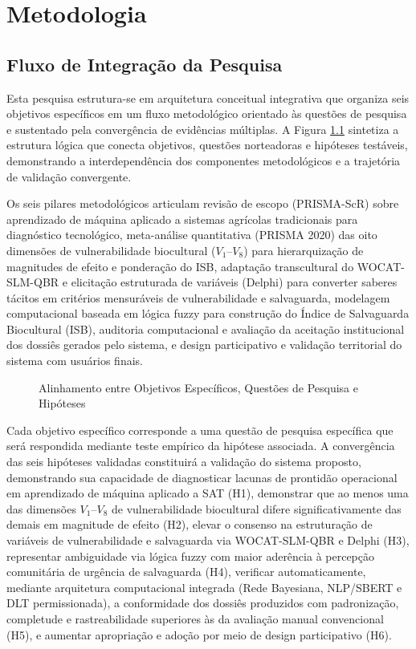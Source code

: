 \pagestyle{plain}
\chapter{Metodologia}

\section{Fluxo de Integração da Pesquisa}

Esta pesquisa estrutura-se em arquitetura conceitual integrativa que organiza seis objetivos específicos em um fluxo metodológico orientado às questões de pesquisa e sustentado pela convergência de evidências múltiplas. A Figura \ref{fig:fluxo_objetivos} sintetiza a estrutura lógica que conecta objetivos, questões norteadoras e hipóteses testáveis, demonstrando a interdependência dos componentes metodológicos e a trajetória de validação convergente.

Os seis pilares metodológicos articulam revisão de escopo (PRISMA-ScR) sobre aprendizado de máquina aplicado a sistemas agrícolas tradicionais para diagnóstico tecnológico, meta-análise quantitativa (PRISMA 2020) das oito dimensões de vulnerabilidade biocultural ($V_1$--$V_8$) para hierarquização de magnitudes de efeito e ponderação do ISB, adaptação transcultural do WOCAT-SLM-QBR e elicitação estruturada de variáveis (Delphi) para converter saberes tácitos em critérios mensuráveis de vulnerabilidade e salvaguarda, modelagem computacional baseada em lógica fuzzy para construção do Índice de Salvaguarda Biocultural (ISB), auditoria computacional e avaliação da aceitação institucional dos dossiês gerados pelo sistema, e design participativo e validação territorial do sistema com usuários finais.


\begin{figure}[H]
  \centering
  \caption{Alinhamento entre Objetivos Específicos, Questões de Pesquisa e Hipóteses}
  \resizebox{\textwidth}{!}{%
  }
  \label{fig:fluxo_objetivos}
\end{figure}


Cada objetivo específico corresponde a uma questão de pesquisa específica que será respondida mediante teste empírico da hipótese associada. A convergência das seis hipóteses validadas constituirá a validação do sistema proposto, demonstrando sua capacidade de diagnosticar lacunas de prontidão operacional em aprendizado de máquina aplicado a SAT (H1), demonstrar que ao menos uma das dimensões $V_1$--$V_8$ de vulnerabilidade biocultural difere significativamente das demais em magnitude de efeito (H2), elevar o consenso na estruturação de variáveis de vulnerabilidade e salvaguarda via WOCAT-SLM-QBR e Delphi (H3), representar ambiguidade via lógica fuzzy com maior aderência à percepção comunitária de urgência de salvaguarda (H4), verificar automaticamente, mediante arquitetura computacional integrada (Rede Bayesiana, NLP/SBERT e DLT permissionada), a conformidade dos dossiês produzidos com padronização, completude e rastreabilidade superiores às da avaliação manual convencional (H5), e aumentar apropriação e adoção por meio de design participativo (H6).

